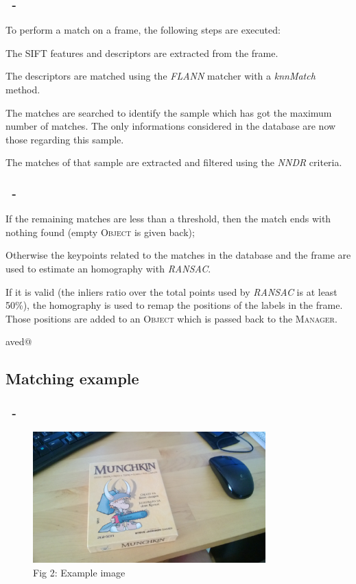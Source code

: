 \documentclass{beamer}
\makeatletter
\newenvironment{cenumerate}{
  \enumerate
  \setcounter{\@enumctr}{\csname saved@\@enumctr\endcsname}
}{
  \expandafter\xdef\csname saved@\@enumctr\endcsname{\the\value{\@enumctr}}
  \endenumerate
}
\newenvironment{cenumerate*}{
  \enumerate
}{
  \expandafter\xdef\csname saved@\@enumctr\endcsname{\the\value{\@enumctr}}
  \endenumerate
}
\makeatother
\begin{document}
  \begin{frame}
    \frametitle{\insertsection\ - \insertsubsection}
    To perform a match on a frame, the following steps are executed:
    \begin{cenumerate*}
      \item The SIFT features and descriptors are extracted from the frame.
      \item The descriptors are matched using the \emph{FLANN} matcher with
        a \emph{knnMatch} method.
      \item The matches are searched to identify the sample which has got 
        the maximum number of matches. The only informations considered in
        the database are now those regarding this sample.
      \item The matches of that sample are extracted and filtered using the
        \emph{NNDR} criteria.
    \end{cenumerate*}
  \end{frame}

  \begin{frame}
    \frametitle{\insertsection\ - \insertsubsection}
    \begin{cenumerate}
      \item If the remaining matches are less than a threshold, then the
	 	match ends with nothing found (empty \textsc{Object} is given back);
      \item Otherwise the keypoints related to the matches in the database and
        the frame are used to estimate an homography with \emph{RANSAC}.
      \item If it is valid (the inliers ratio over the total points used by
        \emph{RANSAC} is at least 50\%), the homography is used to remap the positions
        of the labels in the frame. Those positions are added to an
        \textsc{Object} which is passed back to the \textsc{Manager}.
    \end{cenumerate}
  \end{frame}

  \subsection{Matching example}

  \begin{frame}
    \frametitle{\insertsection\ - \insertsubsection}
	\begin{figure}
		\centering
		\includegraphics[width=0.8\textwidth]{images/sample.jpg}\\
		Fig 2: Example image
	\end{figure}
  \end{frame}
\end{document}
